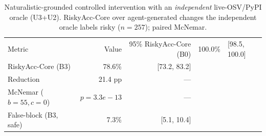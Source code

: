\begin{table}[t]\centering
\caption{Naturalistic-grounded controlled intervention with an \emph{independent} live-OSV/PyPI oracle (U3+U2). RiskyAcc-Core over agent-generated changes the independent oracle labels risky ($n=257$); paired McNemar.}
\label{tab:e1a-indep}
\begin{tabular}{lrr}
\toprule
Metric & Value & 95\%%
\midrule
RiskyAcc-Core (B0) & 100.0\% & [98.5, 100.0] \\
RiskyAcc-Core (B3) & 78.6\% & [73.2, 83.2] \\
Reduction & 21.4 pp & --- \\
McNemar ($b{=}55,c{=}0$) & $p{=}3.3e-13$ & --- \\
False-block (B3, safe) & 7.3\% & [5.1, 10.4] \\
\bottomrule
\end{tabular}
\end{table}
